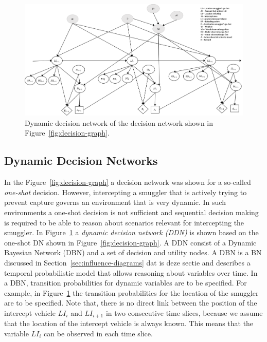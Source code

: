 \documentclass[conference]{IEEEtran}
\begin{document}
\begin{figure}[!t]
\begin{center}
 \includegraphics[width=.95\textwidth]{img/dynamic-decision-graph.png}
 \caption{Dynamic decision network of the decision network shown in Figure~\ref{fig:decision-graph}.}\label{fig:ddn} 
\end{center}
\end{figure}


\subsection{Dynamic Decision Networks}
\label{sub:dyn-dec-net}

In the Figure~\ref{fig:decision-graph} a decision network was shown for a so-called \emph{one-shot} decision. However, intercepting a smuggler that is actively trying to prevent capture governs an environment that is very dynamic. In such environments a one-shot decision is not sufficient and sequential decision making is required to be able to reason about scenarios relevant for intercepting the smuggler. In Figure~\ref{fig:ddn} a {\em dynamic decision network (DDN)} is shown based on the one-shot DN shown in Figure~\ref{fig:decision-graph}. A DDN consist of a Dynamic Bayesian Network (DBN) \cite{murphy00book} and a set of decision and utility nodes. A DBN is a BN discussed in Section~\ref{sec:influence-diagrams} {\red dat is deze sectie} and describes a temporal probabilistic model that allows reasoning about variables over time. In a DBN, transition probabilities for dynamic variables are to be specified. For example, in Figure~\ref{fig:ddn} the transition probabilities for the location of the smuggler are to be specified. Note that, there is no direct link between the position of the intercept vehicle $LI_i$ and $LI_{i+1}$ in two consecutive time slices, because we assume that the location of the intercept vehicle is always known. This means that the variable $LI_i$ can be observed in each time slice.
\end{document}
